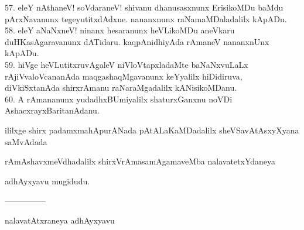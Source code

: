 \documentclass{article}
\begin{document}
57. eleY nAthaneV! soVdaraneV! shivanu dhanusasxnunx ErisikoMDu baMdu pArxNavanunx tegeyutitxdAdxne. nananxnunx raNamaMDaladalilx kApADu.\\
58. eleY aNaNxneV! ninanx hesaranunx heVLikoMDu aneVkaru duHKasAgaravanunx dATidaru. kaqpAnidhiyAda rAmaneV nananxnUnx kApADu.\\
59. hiVge heVLutitxruvAgaleV niVloVtapxladaMte baNaNxvuLaLx rAjiVvaloVcananAda maqgashaqMgavanunx keYyalilx hiDidiruva, diVkiSxtanAda shirxrAmanu raNaraMgadalilx kANisikoMDanu.\\
60. A rAmananunx yudadhxBUmiyalilx shaturxGanxnu noVDi AshacxrayxBaritanAdanu.\\

\begin{center}
ililxge shirx padamxmahApurANada pAtALaKaMDadalilx sheVSavAtAsxyXyana saMvAdada
\end{center}

\begin{center}
rAmAshavxmeVdhadalilx shirxVrAmasamAgamaveMba nalavatetxYdaneya
\end{center}

\begin{center}
adhAyxyavu mugidudu.
\end{center}

\begin{center}
---------------
\end{center}

\begin{center}
nalavatAtxraneya adhAyxyavu
\end{center}
\end{document}
